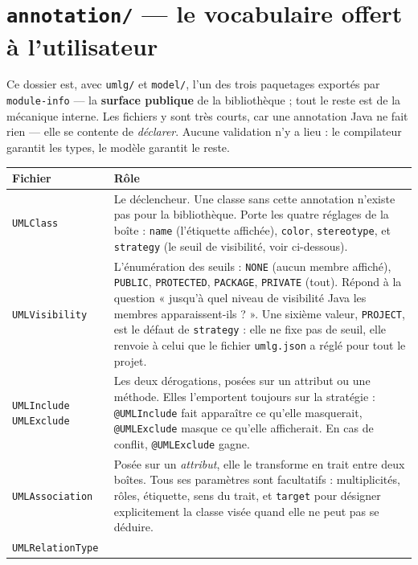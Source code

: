 \documentclass[12pt, a4paper]{article}
\begin{document}
\section{\texttt{annotation/} — le vocabulaire offert à l'utilisateur}

Ce dossier est, avec \texttt{umlg/} et \texttt{model/}, l'un des trois paquetages exportés par
\texttt{module-info} — la \textbf{surface publique} de la bibliothèque ; tout le reste est de la
mécanique interne. Les fichiers y sont très courts, car une annotation
Java ne fait rien — elle se contente de \emph{déclarer}. Aucune validation n'y a lieu : le
compilateur garantit les types, le modèle garantit le reste.

\begin{longtable}{L{4.2cm} L{10cm}}
\toprule
\textbf{Fichier} & \textbf{Rôle} \\
\midrule
\endhead
\texttt{UMLClass} &
Le déclencheur. Une classe sans cette annotation n'existe pas pour la bibliothèque. Porte les
quatre réglages de la boîte : \texttt{name} (l'étiquette affichée), \texttt{color},
\texttt{stereotype}, et \texttt{strategy} (le seuil de visibilité, voir ci-dessous). \\
\addlinespace
\texttt{UMLVisibility} &
L'énumération des seuils : \texttt{NONE} (aucun membre affiché), \texttt{PUBLIC},
\texttt{PROTECTED}, \texttt{PACKAGE}, \texttt{PRIVATE} (tout). Répond à la question « jusqu'à
quel niveau de visibilité Java les membres apparaissent-ils ? ». Une sixième valeur,
\texttt{PROJECT}, est le défaut de \texttt{strategy} : elle ne fixe pas de seuil, elle renvoie
à celui que le fichier \texttt{umlg.json} a réglé pour tout le projet. \\
\addlinespace
\texttt{UMLInclude} \newline \texttt{UMLExclude} &
Les deux dérogations, posées sur un attribut ou une méthode. Elles l'emportent toujours sur la
stratégie : \texttt{@UMLInclude} fait apparaître ce qu'elle masquerait, \texttt{@UMLExclude}
masque ce qu'elle afficherait. En cas de conflit, \texttt{@UMLExclude} gagne. \\
\addlinespace
\texttt{UMLAssociation} &
Posée sur un \emph{attribut}, elle le transforme en trait entre deux boîtes. Tous ses
paramètres sont facultatifs : multiplicités, rôles, étiquette, sens du trait, et
\texttt{target} pour désigner explicitement la classe visée quand elle ne peut pas se déduire. \\
\addlinespace
\texttt{UMLRelationType} &

\end{longtable}
\end{document}
